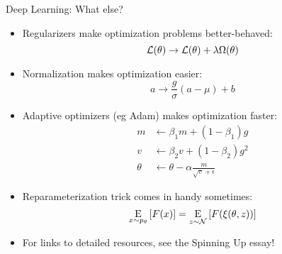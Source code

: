 \begin{frame}{Deep Learning: What else?}

\begin{itemize}
\item Regularizers make optimization problems better-behaved:
\begin{equation*}
{\mathcal L}(\theta) \to {\mathcal L}(\theta) + \lambda \Omega(\theta)
\end{equation*}
\item Normalization makes optimization easier:
\begin{equation*}
a \to \frac{g}{\sigma}\left(a - \mu\right) + b
\end{equation*}
\item Adaptive optimizers (eg Adam) makes optimization faster:
\begin{align*}
m &\leftarrow \beta_1 m + (1-\beta_1) g \\
v &\leftarrow \beta_2 v + (1-\beta_2) g^2 \\
\theta &\leftarrow \theta - \alpha \frac{m}{\sqrt{v}+\epsilon}
\end{align*}
\item Reparameterization trick comes in handy sometimes:
%
\begin{equation*}
\underset{\begin{subarray}{c}x \sim p_{\theta} \end{subarray}}{{\mathrm E}}\left[ F(x) \right] = \underset{\begin{subarray}{c}z \sim {\mathcal N} \end{subarray}}{{\mathrm E}}\left[ F(\xi(\theta, z)) \right]
\end{equation*}
\item For links to detailed resources, see the Spinning Up essay!
\end{itemize}

\end{frame}